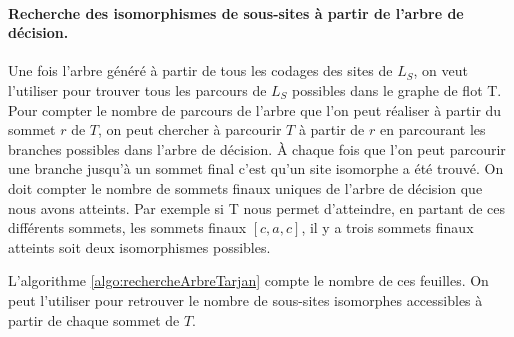 \paragraph{Recherche des isomorphismes de sous-sites à partir de l'arbre de décision.}
Une fois l'arbre généré à partir de tous les codages des sites de $L_S$, on veut l'utiliser pour trouver tous les parcours de $L_S$ possibles dans le graphe de flot T. Pour compter le nombre de parcours de l'arbre que l'on peut réaliser à partir du sommet $r$ de $T$, on peut chercher à parcourir $T$ à partir de $r$ en parcourant les branches possibles dans l'arbre de décision. À chaque fois que l'on peut parcourir une branche jusqu'à un sommet final c'est qu'un site isomorphe a été trouvé. On doit compter le nombre de sommets finaux uniques de l'arbre de décision que nous avons atteints. Par exemple si T nous permet d'atteindre, en partant de ces différents sommets, les sommets finaux $[c, a, c]$, il y a trois sommets finaux atteints soit deux isomorphismes possibles.

L'algorithme \ref{algo:rechercheArbreTarjan} compte le nombre de ces feuilles.
On peut l'utiliser pour retrouver le nombre de sous-sites isomorphes accessibles à partir de chaque sommet de $T$.

